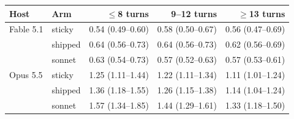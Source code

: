 \begin{tabular*}{\textwidth}{@{\extracolsep{\fill}}l l r r r @{}}
\toprule
Host & Arm & $\le$8 turns & 9--12 turns & $\ge$13 turns \\
\midrule
Fable 5.1 & sticky & 0.54 (0.49--0.60) & 0.58 (0.50--0.67) & 0.56 (0.47--0.69) \\
 & shipped & 0.64 (0.56--0.73) & 0.64 (0.56--0.73) & 0.62 (0.56--0.69) \\
 & sonnet & 0.63 (0.54--0.73) & 0.57 (0.52--0.63) & 0.57 (0.53--0.61) \\
\addlinespace[3pt]
Opus 5.5 & sticky & 1.25 (1.11--1.44) & 1.22 (1.11--1.34) & 1.11 (1.01--1.24) \\
 & shipped & 1.36 (1.18--1.55) & 1.26 (1.15--1.38) & 1.14 (1.04--1.24) \\
 & sonnet & 1.57 (1.34--1.85) & 1.44 (1.29--1.61) & 1.33 (1.18--1.50) \\
\bottomrule
\end{tabular*}
